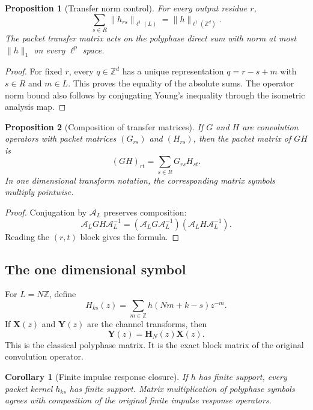 \documentclass{aomart}
\newtheorem{proposition}[proposition]{Proposition}
\newtheorem{corollary}[corollary]{Corollary}
\theoremstyle{definition}
\theoremstyle{remark}
\newcommand{\ZZ}{\mathbb Z}
\newcommand{\Acal}{\mathcal A}
\begin{document}
\begin{proposition}[Transfer norm control]\label{prop:transfer_norm_control}
For every output residue \(r\),
\[
\sum_{s\in R}\|h_{rs}\|_{\ell^1(L)}
=
\|h\|_{\ell^1(\ZZ^d)}.
\]
The packet transfer matrix acts on the polyphase direct sum with norm at most \(\|h\|_1\) on every \(\ell^p\) space.
\end{proposition}

\begin{proof}
For fixed \(r\), every \(q\in\ZZ^d\) has a unique representation \(q=r-s+m\) with \(s\in R\) and \(m\in L\). This proves the equality of the absolute sums. The operator norm bound also follows by conjugating Young's inequality through the isometric analysis map.
\end{proof}

\begin{proposition}[Composition of transfer matrices]\label{prop:transfer_composition}
If \(G\) and \(H\) are convolution operators with packet matrices \((G_{rs})\) and \((H_{rs})\), then the packet matrix of \(GH\) is
\[
(GH)_{rt}
=
\sum_{s\in R}G_{rs}H_{st}.
\]
In one dimensional transform notation, the corresponding matrix symbols multiply pointwise.
\end{proposition}

\begin{proof}
Conjugation by \(\Acal_L\) preserves composition:
\[
\Acal_LGH\Acal_L^{-1}
=
(\Acal_LG\Acal_L^{-1})(\Acal_LH\Acal_L^{-1}).
\]
Reading the \((r,t)\) block gives the formula.
\end{proof}

\subsection{The one dimensional symbol}

For \(L=N\ZZ\), define
\[
H_{ks}(z)=\sum_{m\in\ZZ}h(Nm+k-s)z^{-m}.
\]
If \(\bm X(z)\) and \(\bm Y(z)\) are the channel transforms, then
\[
\bm Y(z)=\bm H_N(z)\bm X(z).
\]
This is the classical polyphase matrix. It is the exact block matrix of the original convolution operator.

\begin{corollary}[Finite impulse response closure]\label{cor:fir_closure}
If \(h\) has finite support, every packet kernel \(h_{ks}\) has finite support. Matrix multiplication of polyphase symbols agrees with composition of the original finite impulse response operators.
\end{corollary}
\end{document}
